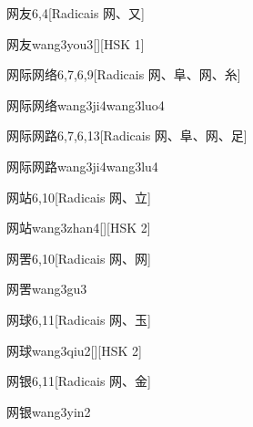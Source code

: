 \begin{entry}{网友}{6,4}[Radicais ⽹、⼜]
  \begin{phonetics}{网友}{wang3you3}[][HSK 1]
  \end{phonetics}
\end{entry}

\begin{entry}{网际网络}{6,7,6,9}[Radicais ⽹、⾩、⽹、⽷]
  \begin{phonetics}{网际网络}{wang3ji4wang3luo4}
  \end{phonetics}
\end{entry}

\begin{entry}{网际网路}{6,7,6,13}[Radicais ⽹、⾩、⽹、⾜]
  \begin{phonetics}{网际网路}{wang3ji4wang3lu4}
  \end{phonetics}
\end{entry}

\begin{entry}{网站}{6,10}[Radicais ⽹、⽴]
  \begin{phonetics}{网站}{wang3zhan4}[][HSK 2]
  \end{phonetics}
\end{entry}

\begin{entry}{网罟}{6,10}[Radicais ⽹、⽹]
  \begin{phonetics}{网罟}{wang3gu3}
  \end{phonetics}
\end{entry}

\begin{entry}{网球}{6,11}[Radicais ⽹、⽟]
  \begin{phonetics}{网球}{wang3qiu2}[][HSK 2]
  \end{phonetics}
\end{entry}

\begin{entry}{网银}{6,11}[Radicais ⽹、⾦]
  \begin{phonetics}{网银}{wang3yin2}
  \end{phonetics}
\end{entry}

